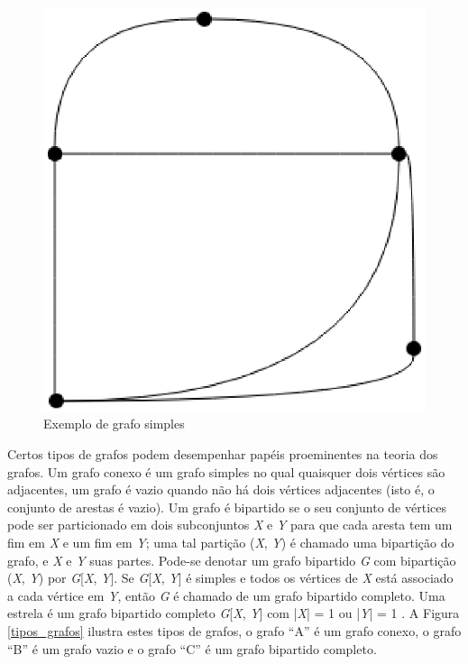 \begin{figure}[!h]
	\centering
	\includegraphics[scale=0.25]{figuras/capitulo2/grafo_simples.eps}
	\caption{Exemplo de grafo simples}
	\label{grafo_simples}
\end{figure}

Certos tipos de grafos podem desempenhar papéis proeminentes na teoria dos grafos. Um grafo conexo é um grafo simples no qual quaisquer dois vértices são adjacentes, um grafo é vazio quando não há dois vértices adjacentes (isto é, o conjunto de arestas é vazio). Um grafo é bipartido se o seu conjunto de vértices pode ser particionado em dois subconjuntos \textit{X} e \textit{Y} para que cada aresta tem um fim em \textit{X} e um fim em \textit{Y}; uma tal partição (\textit{X}, \textit{Y}) é chamado uma bipartição do grafo, e \textit{X} e \textit{Y} suas partes. Pode-se denotar um grafo bipartido \textit{G} com bipartição (\textit{X}, \textit{Y}) por \textit{G}[\textit{X}, \textit{Y}]. Se \textit{G}[\textit{X}, \textit{Y}] é simples e todos os vértices de \textit{X} está associado a cada vértice em \textit{Y}, então \textit{G} é chamado de um grafo bipartido completo. Uma estrela é um grafo bipartido completo \textit{G}[\textit{X}, \textit{Y}] com |\textit{X}| = 1 ou |\textit{Y}| = 1 \cite{Diestel:1997}.  A Figura \ref{tipos_grafos} ilustra estes tipos de grafos, o grafo ``A'' é um grafo conexo, o grafo ``B'' é um grafo vazio e o grafo ``C'' é um grafo bipartido completo.

